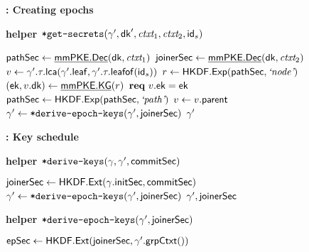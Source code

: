 \begin{figure*}[!p]
\begin{anybox}{\sffamily\bfseries \saik : Creating epochs}
\begin{minipage}[t]{0.49\linewidth}
        \medskip
        {\bf {helper ${\textnormal{\tt*get-secrets}}(\gamma', {\mathsf{dk}}', {\normalfont\textit{ctxt}}_1, {\normalfont\textit{ctxt}}_2, {\mathsf{id}}_s)$}}
				\begin{algorithmic}
					\State \KwTry{} ${\mathsf{pathSec}} \gets \underline{{\mathsf{mmPKE}}.{\mathsf{Dec}}}({\mathsf{dk}}, {\normalfont\textit{ctxt}}_1)$
          \State \KwTry{} ${\mathsf{joinerSec}} \gets \underline{{\mathsf{mmPKE}}.{\mathsf{Dec}}}({\mathsf{dk}}, {\normalfont\textit{ctxt}}_2)$
					\State $v \gets \gamma'.\tau.{\mathsf{lca}}(\gamma'.{\mathsf{leaf}}, \gamma'.\tau.{\mathsf{leafof}}({\mathsf{id}}_s))$
					  \State $r \gets {\ensuremath{\mathsf{HKDF}}}.{\mathsf{Exp}}({\mathsf{pathSec}}, {\text{\normalfont \it`node'}})$
					  \State $({\mathsf{ek}}, v.{\mathsf{dk}}) \gets \underline{{\mathsf{mmPKE}}.{\mathsf{KG}}}(r)$
					  \State $\textbf{req}\ v.{\mathsf{ek}} = {\mathsf{ek}}$
					  \State ${\mathsf{pathSec}} \gets {\ensuremath{\mathsf{HKDF}}}.{\mathsf{Exp}}({\mathsf{pathSec}}, {\text{\normalfont \it`path'}})$
					  \State $v \gets v.{\mathsf{parent}}$
					\EndWhile
          \State $\gamma' \gets {{\ensuremath{\textnormal{\tt*derive-epoch-keys}}}}(\gamma', {\mathsf{joinerSec}})$
          \State \Return $\gamma'$
        \end{algorithmic}
      \end{minipage}
  \end{anybox}
	\begin{tcbraster}[raster columns=2, raster equal height]
		\begin{anybox}{\sffamily\bfseries \saik : Key schedule}
				\begin{minipage}[t]{\linewidth}
					{\bf {helper ${{\textnormal{\tt*derive-keys}}}(\gamma, \gamma', {\mathsf{commitSec}})$}}
					\begin{algorithmic}
						\State ${\mathsf{joinerSec}} \gets {\ensuremath{\mathsf{HKDF}}}.{\mathsf{Ext}}(\gamma.{\mathsf{initSec}}, {\mathsf{commitSec}})$
						\State $\gamma' \gets {{\ensuremath{\textnormal{\tt*derive-epoch-keys}}}}(\gamma', {\mathsf{joinerSec}})$
						\State \Return $\gamma', {\mathsf{joinerSec}}$
					\end{algorithmic}

					\medskip
					{\bf {helper ${{\textnormal{\tt*derive-epoch-keys}}}(\gamma', {\mathsf{joinerSec}})$}}
					\begin{algorithmic}
            \State ${\mathsf{epSec}} \gets {\ensuremath{\mathsf{HKDF}}}.{\mathsf{Ext}}({\mathsf{joinerSec}}, \gamma'.{\mathsf{grpCtxt}}())$


\end{algorithmic}
\end{minipage}
\end{anybox}
\end{tcbraster}
\end{figure*}
